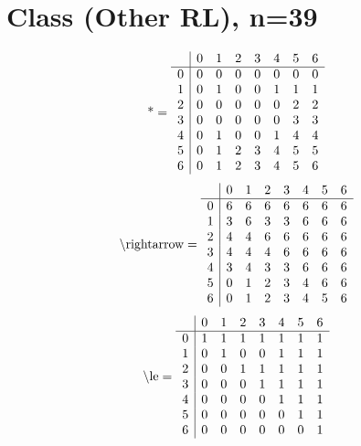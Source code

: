 \documentclass[11pt]{article}
\begin{document}
\section{Class (Other RL), n=39}
\[\text{*} = 
\begin{array}{r | r r r r r r r}
 & 0 & 1 & 2 & 3 & 4 & 5 & 6 \\ \hline
0 & 0 & 0 & 0 & 0 & 0 & 0 & 0 \\
1 & 0 & 1 & 0 & 0 & 1 & 1 & 1 \\
2 & 0 & 0 & 0 & 0 & 0 & 2 & 2 \\
3 & 0 & 0 & 0 & 0 & 0 & 3 & 3 \\
4 & 0 & 1 & 0 & 0 & 1 & 4 & 4 \\
5 & 0 & 1 & 2 & 3 & 4 & 5 & 5 \\
6 & 0 & 1 & 2 & 3 & 4 & 5 & 6 \\
\end{array}
\]
\[\text{\textbackslash rightarrow} = 
\begin{array}{r | r r r r r r r}
 & 0 & 1 & 2 & 3 & 4 & 5 & 6 \\ \hline
0 & 6 & 6 & 6 & 6 & 6 & 6 & 6 \\
1 & 3 & 6 & 3 & 3 & 6 & 6 & 6 \\
2 & 4 & 4 & 6 & 6 & 6 & 6 & 6 \\
3 & 4 & 4 & 4 & 6 & 6 & 6 & 6 \\
4 & 3 & 4 & 3 & 3 & 6 & 6 & 6 \\
5 & 0 & 1 & 2 & 3 & 4 & 6 & 6 \\
6 & 0 & 1 & 2 & 3 & 4 & 5 & 6 \\
\end{array}
\]
\[\text{\textbackslash le} = 
\begin{array}{r | r r r r r r r}
 & 0 & 1 & 2 & 3 & 4 & 5 & 6 \\ \hline
0 & 1 & 1 & 1 & 1 & 1 & 1 & 1 \\
1 & 0 & 1 & 0 & 0 & 1 & 1 & 1 \\
2 & 0 & 0 & 1 & 1 & 1 & 1 & 1 \\
3 & 0 & 0 & 0 & 1 & 1 & 1 & 1 \\
4 & 0 & 0 & 0 & 0 & 1 & 1 & 1 \\
5 & 0 & 0 & 0 & 0 & 0 & 1 & 1 \\
6 & 0 & 0 & 0 & 0 & 0 & 0 & 1 \\
\end{array}
\]
\end{document}
